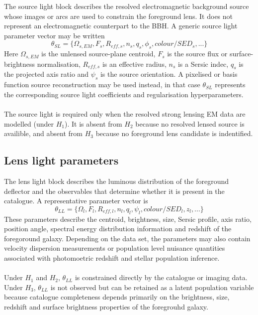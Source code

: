 \documentclass[pdflatex,sn-mathphys-num]{sn-jnl}%
\theoremstyle{thmstyleone}%
\theoremstyle{thmstyletwo}%
\theoremstyle{thmstylethree}%
\begin{document}
The source light block describes the resolved electromagnetic background source whose images or arcs are used to constrain the foreground lens.
It does not represent an electromagnetic counterpart to the BBH.
A generic source light parameter vector may be written
\begin{equation}
\theta_{SL} = \{\Omega_{s,EM},F_s,R_{eff,s},n_s,q_s,\phi_s,colour/SED_s,...\}
\end{equation}
Here $\Omega_{s,EM}$ is the unlensed source-plane centroid, $F_s$ is the source flux or surface-brightness normalisation, $R_{eff,s}$ is an effective radius, $n_s$ is a Sersic indec, $q_s$ is the projected axis ratio and $\psi_s$ is the source orientation.
A pixelised or basis function source reconstruction may be used instead, in that case $\theta_{SL}$ represents the corresponding source light coefficients and regularisation hyperparameters.\\
\\The source light is required only when the resolved strong lensing EM data are modelled (under $H_1$).
It is absent from $H_2$ because no resolved lensed source is availible, and absent from $H_3$ because no foreground lens candidate is indentified.

\subsection{Lens light parameters}

The lens light block describes the luminous distribution of the foreground deflector and the observables that determine whether it is present in the catalogue.
A representative parameter vector is
\begin{equation}
\theta_{LL} = \{\Omega_l,F_l,R_{eff,l},n_l,q_l,\psi_l,colour/SED_l,z_l,...\}
\end{equation}
These parameters describe the centroid, brightness, size, Sersic profile, axis ratio, position angle, spectral energy distribution information and redshift of the foregoround galaxy.
Depending on the data set, the parameters may also contain velocity dispersion measurements or population level nuisance quantities associated with photomoetric redshift and stellar population inference.\\
\\Under $H_1$ and $H_2$, $\theta_{LL}$ is constrained directly by the catalogue or imaging data.
Under $H_3$, $\theta_{LL}$ is not observed but can be retained as a latent population variable because catalogue completeness depends primarily on the brightness, size, redshift and surface brightness properties of the foregrouhd galaxy.
\end{document}
